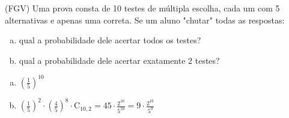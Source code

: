 \begin{ex}
(FGV) Uma prova consta de 10 testes de múltipla escolha, cada um com 5 alternativas e apenas uma correta. Se um aluno "chutar" todas as respostas:
  \begin{enumerate}  [(a)]
      \item qual a probabilidade dele acertar todos os testes? 
      \item qual a probabilidade dele acertar exatamente 2 testes?
  \end{enumerate}
     \begin{sol}
      \phantom{A}
       \begin{enumerate}  [(a)]
           \item $(\frac{1}{5})^{10}$
           \item $(\frac{1}{5})^2\cdot(\frac{4}{5})^8\cdot \mathrm{C}_{{10},2}=45\cdot \frac{2^{16}}{5^{10}} = 9 \cdot \frac{2^{16}}{5^9}$
       \end{enumerate}
     \end{sol}
\end{ex}